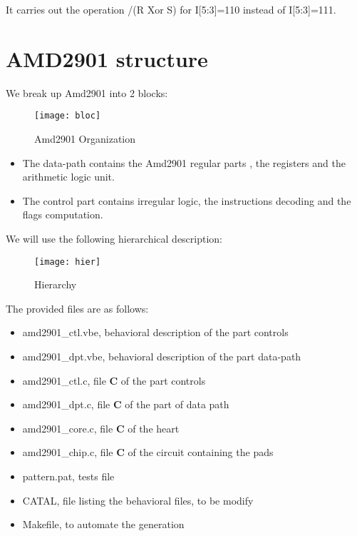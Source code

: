 \documentclass{article}
\begin{document}
{It carries out the operation /(R Xor S) for I[5:3]=110 instead of
I[5:3]=111.

\newpage
\section{AMD2901 structure}


We break up Amd2901 into 2 blocks: %
\begin{figure}[H]\center
\leavevmode
\texttt{[image: bloc]}
\caption{Amd2901 Organization  \label{bloc}}
\end{figure}


\begin{itemize}\itemsep=-.8ex
\item The data-path contains the Amd2901 regular parts , the
registers and the arithmetic logic unit. 
\item The control part contains irregular logic, 
      the instructions decoding and the flags computation.
\end{itemize}

\newpage
We will use the following hierarchical description:
\begin{figure}[H]\center
\leavevmode
\texttt{[image: hier]}
\caption{Hierarchy \label{hier}}
\end{figure}

The provided files are as follows:\\
\begin{itemize}\itemsep=-.8ex
\item amd2901\_ctl.vbe, behavioral description of the part
controls \item amd2901\_dpt.vbe, behavioral description of the
part data-path \item amd2901\_ctl.c, file { \bf C } of the part
controls \item amd2901\_dpt.c, file { \bf C } of the part of data
path \item amd2901\_core.c, file { \bf C } of the heart \item
amd2901\_chip.c, file { \bf C } of the circuit containing the pads
\item pattern.pat, tests file \item CATAL, file listing the
behavioral files, to be modify \item Makefile, to automate the
generation
\end{itemize}


}
\end{document}
